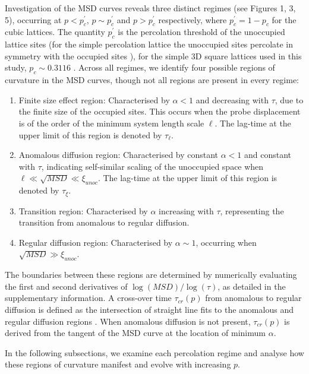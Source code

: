 \documentclass[%
 aip,
 amsmath,amssymb,
reprint, onecolumn %
]{revtex4-1}
\begin{document}
Investigation of the MSD curves reveals three distinct regimes (see Figures 1, 3, 5), occurring at $p < p_{c}^{'}$, $p\sim p_{c}^{'}$ and $p > p_{c}^{'}$ respectively, where $p_{c}^{'} = 1 - p_{c}$ for the cubic lattices. The quantity $p_{c}^{'}$ is the percolation threshold of the unoccupied lattice sites (for the simple percolation lattice the unoccupied sites percolate in symmetry with the occupied sites \cite{Stauffer1992}), for the simple 3D square lattices used in this study, $p_{c} \sim 0.3116$ \cite{Kurzawski2012}. Across all regimes, we identify four possible regions of curvature in the MSD curves, though not all regions are present in every regime:

\begin{enumerate}
    \item Finite size effect region: Characterised by $\alpha < 1$ and decreasing with $\tau$, due to the finite size of the occupied sites. This occurs when the probe displacement is of the order of the minimum system length scale $\ell$. The lag-time at the upper limit of this region is denoted by $\tau_\ell$.
    \item Anomalous diffusion region: Characterised by constant $\alpha < 1$ and constant with $\tau$, indicating self-similar scaling of the unoccupied space when $\ell \ll \sqrt{MSD} \ll \xi_{unoc}$. The lag-time at the upper limit of this region is denoted by $\tau_\xi$.
    \item Transition region: Characterised by $\alpha$ increasing with $\tau$, representing the transition from anomalous to regular diffusion.
    \item Regular diffusion region: Characterised by $\alpha \sim 1$, occurring when $\sqrt{MSD} \gg \xi_{unoc}$.
\end{enumerate}

The boundaries between these regions are determined by numerically evaluating the first and second derivatives of $\log(MSD)/\log(\tau)$, as detailed in the supplementary information. A cross-over time $\tau_{cr}(p)$ from anomalous to regular diffusion is defined as the intersection of straight line fits to the anomalous and regular diffusion regions \cite{Argyrakis1985,Saxton1994}. When anomalous diffusion is not present, $\tau_{cr}(p)$ is derived from the tangent of the MSD curve at the location of minimum $\alpha$.

In the following subsections, we examine each percolation regime and analyse how these regions of curvature manifest and evolve with increasing $p$.
\end{document}
